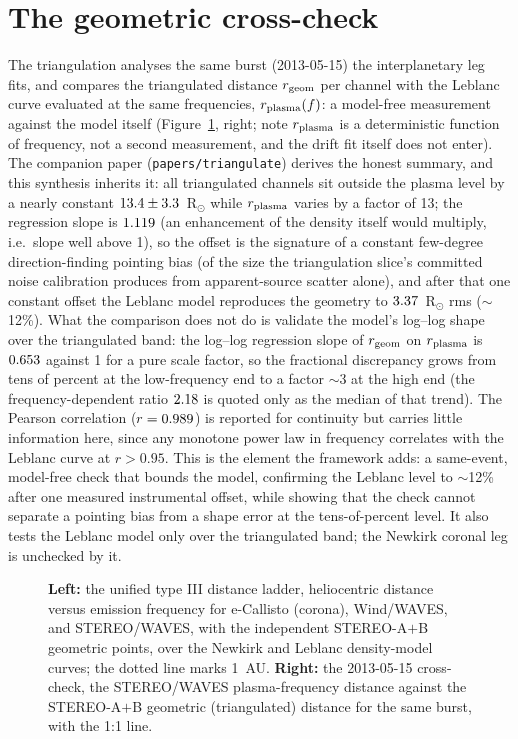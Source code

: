 \documentclass[twocolumn]{aastex631}
\newcommand{\code}[1]{\texttt{#1}}
\begin{document}
\section{The geometric cross-check}
The triangulation analyses the same burst (2013-05-15) the interplanetary leg fits, and compares
the triangulated distance $r_{\rm geom}$ per channel with the Leblanc curve evaluated at the
same frequencies, $r_{\rm plasma}(f)$: a model-free measurement against the model itself
(Figure~\ref{fig:synth}, right; note $r_{\rm plasma}$ is a deterministic function of frequency,
not a second measurement, and the drift fit itself does not enter). The companion paper
(\code{papers/triangulate}) derives the honest summary, and this synthesis inherits it: all
triangulated channels sit outside the plasma level by a nearly constant
$13.4\pm3.3$~R$_\odot$ while $r_{\rm plasma}$ varies by a factor
of 13; the regression slope is $1.119$ (an enhancement of the density itself would
multiply, i.e.\ slope well above 1), so the offset is the signature of a constant few-degree
direction-finding pointing bias (of the size the triangulation slice's committed noise
calibration produces from apparent-source scatter alone), and after that one constant offset
the Leblanc model reproduces the geometry to $3.37$~R$_\odot$ rms ($\sim$12\%).
What the comparison does not do is validate the model's log--log shape over the
triangulated band: the log--log regression slope of $r_{\rm geom}$ on $r_{\rm plasma}$ is
$0.653$ against 1 for a pure scale factor, so the fractional discrepancy grows
from tens of percent at the low-frequency end to a factor $\sim$3 at the high end (the
frequency-dependent ratio $2.18$ is quoted only as the median of that trend). The
Pearson correlation ($r=0.989$) is reported for continuity but carries little
information here, since any monotone power law in frequency correlates with the Leblanc curve at
$r>0.95$. This is the element the framework adds: a same-event, model-free check that
bounds the model, confirming the Leblanc level to $\sim$12\% after one measured
instrumental offset, while showing that the check cannot separate a pointing bias from a shape
error at the tens-of-percent level. It also tests the Leblanc model only over the triangulated
band; the Newkirk coronal leg is unchecked by it.

\begin{figure}
\caption{\textbf{Left:} the unified type III distance ladder, heliocentric distance versus emission
frequency for e-Callisto (corona), Wind/WAVES, and STEREO/WAVES, with the independent STEREO-A$+$B
geometric points, over the Newkirk and Leblanc density-model curves; the dotted line marks 1~AU.
\textbf{Right:} the 2013-05-15 cross-check, the STEREO/WAVES plasma-frequency distance against the
STEREO-A$+$B geometric (triangulated) distance for the same burst, with the 1:1 line.}
\label{fig:synth}
\end{figure}
\end{document}
